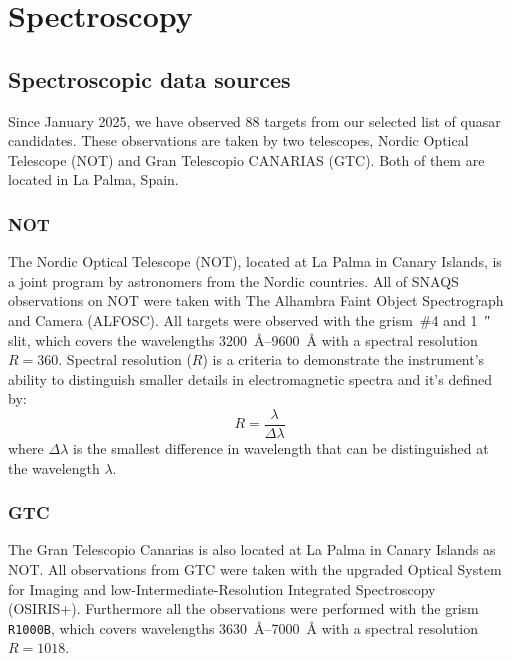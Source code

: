 \chapter{Spectroscopy}
\label{chpt:spec}

\section{Spectroscopic data sources}

Since January 2025, we have observed 88 targets from our selected list of quasar candidates. These observations are taken by two telescopes, Nordic Optical Telescope (NOT) and Gran Telescopio CANARIAS (GTC). Both of them are located in La Palma, Spain.

\subsection{NOT}

The Nordic Optical Telescope (NOT), located at La Palma in Canary Islands, is a joint program by astronomers from the Nordic countries. All of SNAQS observations on NOT were taken with The Alhambra Faint Object Spectrograph and Camera (ALFOSC). All targets were observed with the grism~\#4 and \qty{1}{\arcsecond} slit, which covers the wavelengths \qtyrange{3200}{9600}{\angstrom} with a spectral resolution $R=360$. Spectral resolution ($R$) is a criteria to demonstrate the instrument's ability to distinguish smaller details in electromagnetic spectra and it's defined by: \[R = \frac{\lambda}{\Delta\lambda}\] where $\Delta\lambda$ is the smallest difference in wavelength that can be distinguished at the wavelength $\lambda$.

\subsection{GTC}

The Gran Telescopio Canarias is also located at La Palma in Canary Islands as NOT. All observations from GTC were taken with the upgraded Optical System for Imaging and low-Intermediate-Resolution Integrated Spectroscopy (OSIRIS+). Furthermore all the observations were performed with the grism \texttt{R1000B}, which covers wavelengths \qtyrange{3630}{7000}{\angstrom} with a spectral resolution $R=1018$.


